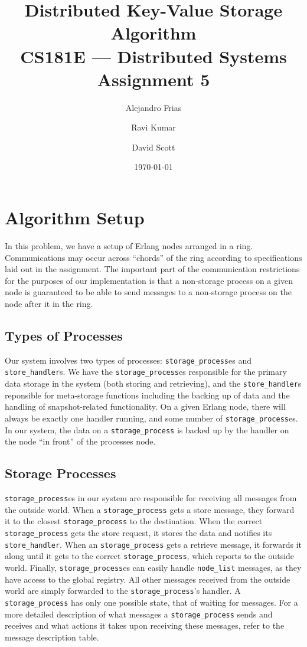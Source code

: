 \documentclass[12pt,letterpaper]{article}
\author{Alejandro Frias \and Ravi Kumar \and David Scott}
\date{\today}
\title{Distributed Key-Value Storage Algorithm\\CS181E --- Distributed Systems\\Assignment 5}
\renewcommand{\tt}[1]{\texttt{#1}}
\newcommand{\sh}{\tt{store\_handler}}
\renewcommand{\sp}{\tt{storage\_process}}
\begin{document}
\maketitle


\onehalfspacing

\section*{Algorithm Setup}

In this problem, we have a setup of Erlang nodes arranged in a ring.  Communications may occur across ``chords'' of the ring according to specifications laid out in the assignment.  The important part of the communication restrictions for the purposes of our implementation is that a non-storage process on a given node is guaranteed to be able to send messages to a non-storage process on the node after it in the ring.

\subsection*{Types of Processes}

Our system involves two types of processes: \sp es and \sh s. We have the \sp es responsible for the primary data storage in the system (both storing and retrieving), and the \sh s reponsible for meta-storage functions including the backing up of data and the handling of snapshot-related functionality. On a given Erlang node, there will always be exactly one handler running, and some number of \sp es. In our system, the data on a \sp{} is backed up by the handler on the node ``in front'' of the processes node.

\subsection*{Storage Processes}

\sp es in our system are responsible for receiving all messages from the outside world. When a \sp{} gets a store message, they forward it to the closest \sp{} to the destination. When the correct \sp{} gets the store request, it stores the data and notifies its \sh. When an \sp{} gets a retrieve message, it forwards it along until it gets to the correct \sp, which reports to the outside world. Finally, \sp es can easily handle \tt{node\_list} messages, as they have access to the global registry. All other messages received from the outside world are simply forwarded to the \sp 's handler. A \sp{} has only one possible state, that of waiting for messages. For a more detailed description of what messages a \sp{} sends and receives and what actions it takes upon receiving these messages, refer to the message description table.
\end{document}

